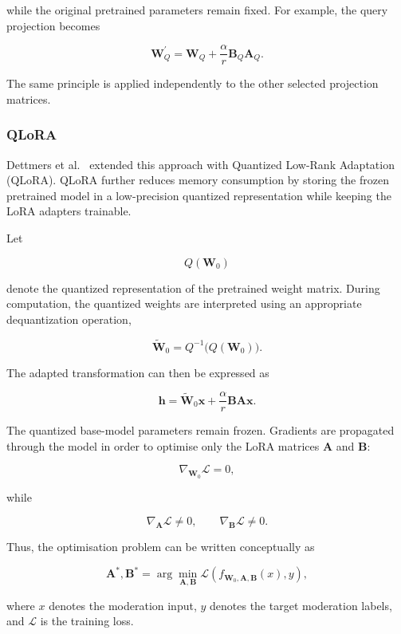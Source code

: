 \documentclass[11pt,a4paper]{article}
\begin{document}
while the original pretrained parameters remain fixed. For example, the
query projection becomes

\[
    \mathbf{W}_{Q}^{\prime}
    =
    \mathbf{W}_{Q}
    +
    \frac{\alpha}{r}
    \mathbf{B}_{Q}\mathbf{A}_{Q}.
\]

The same principle is applied independently to the other selected projection
matrices.

\subsubsection{QLoRA}

Dettmers et al.~\cite{dettmers2023qlora} extended this approach with Quantized Low-Rank
Adaptation (QLoRA). QLoRA further reduces memory consumption by storing the
frozen pretrained model in a low-precision quantized representation while
keeping the LoRA adapters trainable.

Let

\[
    Q(\mathbf{W}_0)
\]

denote the quantized representation of the pretrained weight matrix.
During computation, the quantized weights are interpreted using an
appropriate dequantization operation,

\[
    \widetilde{\mathbf{W}}_0
    =
    Q^{-1}\bigl(Q(\mathbf{W}_0)\bigr).
\]

The adapted transformation can then be expressed as

\[
    \mathbf{h}
    =
    \widetilde{\mathbf{W}}_0\mathbf{x}
    +
    \frac{\alpha}{r}
    \mathbf{B}\mathbf{A}\mathbf{x}.
\]

The quantized base-model parameters remain frozen. Gradients are propagated
through the model in order to optimise only the LoRA matrices
$\mathbf{A}$ and $\mathbf{B}$:

\[
    \nabla_{\mathbf{W}_0}\mathcal{L} = 0,
\]

while

\[
    \nabla_{\mathbf{A}}\mathcal{L} \neq 0,
    \qquad
    \nabla_{\mathbf{B}}\mathcal{L} \neq 0.
\]

Thus, the optimisation problem can be written conceptually as

\[
    \mathbf{A}^{*},\mathbf{B}^{*}
    =
    \arg\min_{\mathbf{A},\mathbf{B}}
    \mathcal{L}
    \left(
        f_{\mathbf{W}_0,\mathbf{A},\mathbf{B}}(x),
        y
    \right),
\]

where $x$ denotes the moderation input, $y$ denotes the target moderation
labels, and $\mathcal{L}$ is the training loss.
\end{document}
